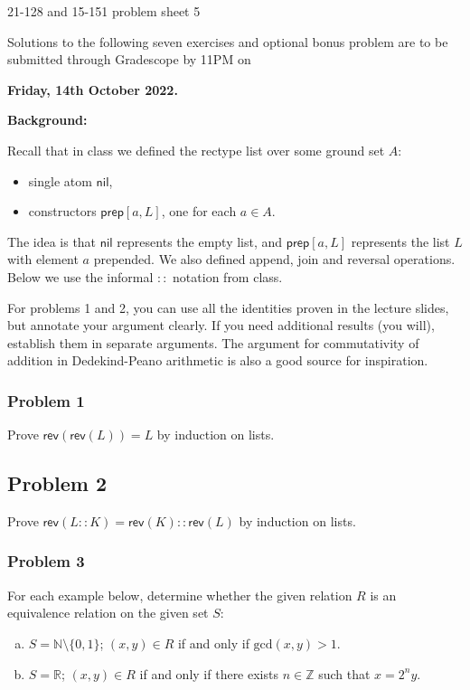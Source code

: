 \documentclass[11pt,onecolumn,fleqn]{article}
\theoremstyle{definition}
\def\nil{\mathsf{nil}}
\def\prep{\mathsf{prep}}
\def\rev{\mathsf{rev}}
\begin{document}
\thispagestyle{empty}
\begin{center}
{\Huge 21-128 and 15-151 problem sheet 5}

Solutions to the following seven exercises and optional bonus problem are to be submitted through 
Gradescope by 11PM on

\textbf{Friday, 14th October 2022.}

\end{center}

\textbf{Background:}

Recall that in class we defined the rectype list over some ground set $A$:
\begin{itemize}
\item  single atom $\nil$,
\item  constructors $\prep[a,L]$, one for each $a \in A$.
\end{itemize}

The idea is that $\nil$ represents the empty list, and $\prep[a,L]$
represents the list $L$ with element $a$ prepended. 
We also defined append, join and reversal operations.
Below we use the informal $::$ notation from class.

For problems 1 and 2, you can use all the identities proven in the lecture slides, but annotate
your argument clearly.
If you need additional results (you will), establish them in separate arguments.
The argument for commutativity of addition in Dedekind-Peano arithmetic is
also a good source for inspiration.

\subsubsection*{Problem 1}
Prove $\rev(\rev(L)) = L$ by induction on lists.

\subsection*{Problem 2}
Prove $\rev(L::K) = \rev(K) :: \rev(L)$ by induction on lists.

\subsubsection*{Problem 3}
For each example below, determine whether the given relation $R$ is an equivalence relation on the given set $S$:
\begin{enumerate}[(a)]
\item $S = \mathbb{N} \setminus \{ 0, 1 \}$; $(x,y) \in R$ if and only if $\mathrm{gcd}(x,y) > 1$.
\item $S = \mathbb{R}$; $(x,y) \in R$ if and only if there exists $n \in \mathbb{Z}$ such that $x=2^ny$.
\end{enumerate}
\end{document}
